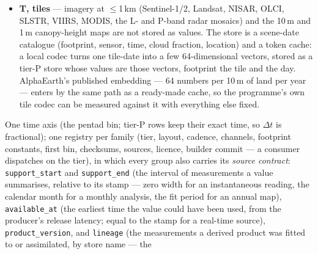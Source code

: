 \documentclass[10pt]{article}
\newcommand{\code}[1]{\texttt{#1}}
\begin{document}
\begin{itemize}
row offsets per bin, so the $k$ nearest observations in space--time are one
bounded scan that stops at the anchor's own bin and never reads the future.
The bin is derived in integers, $b=\lfloor t_s/432{,}000\rfloor$ with $t_s$
the seconds since 1982-01-01T00:00\,UTC, floored toward minus infinity, so
pre-1982 rows keep negative bins (drifters from 1979, carbon from 1957, ship
reports from 1662) and the loader, not the store, clips to a tensor's axis;
each store's index runs over its own first bin, which is not zero. The
seconds are int32 (1913 to 2050), or int64 in a store whose record begins
before 1914 (schema 3 against schema 2). They replaced float32 days, which
resolve 21\,s in 1993 and 84\,s by 2015 --- up to 316 consecutive one-second
altimeter samples shared one timestamp, 550\,km of track inside which
$\Delta t$ ordered nothing, and 908 carbon rows within 84\,s of a pentad
boundary were filed one bin late; integer seconds cost the same four bytes.
\item \textbf{T, tiles} --- imagery at ${\le}$1\,km (Sentinel-1/2, Landsat,
NISAR, OLCI, SLSTR, VIIRS, MODIS, the L- and P-band radar mosaics) and the
10\,m and 1\,m canopy-height maps are not stored as values. The store is a
scene-date catalogue (footprint, sensor, time, cloud fraction, location) and
a token cache: a local codec turns one tile-date into a few 64-dimensional
vectors, stored as a tier-P store whose values are those vectors, footprint
the tile and the day. AlphaEarth's published embedding \cite{alphaearth}
--- 64 numbers per 10\,m of land per year --- enters by the same path as a
ready-made cache, so the programme's own tile codec can be measured against
it with everything else fixed.
\end{itemize}
One time axis (the pentad bin; tier-P rows keep their exact time, so
$\Delta t$ is fractional); one registry per family (tier, layout, cadence,
channels, footprint constants, first bin, checksums, sources, licence,
builder commit --- a consumer dispatches on the tier), in which every group
also carries its \emph{source contract}: \code{support\_start} and
\code{support\_end} (the interval of measurements a value summarises,
relative to its stamp --- zero width for an instantaneous reading, the
calendar month for a monthly analysis, the fit period for an annual map),
\code{available\_at} (the earliest time the value could have been used,
from the producer's release latency; equal to the stamp for a real-time
source), \code{product\_version}, and \code{lineage} (the measurements a
derived product was fitted to or assimilated, by store name --- the
\end{document}
